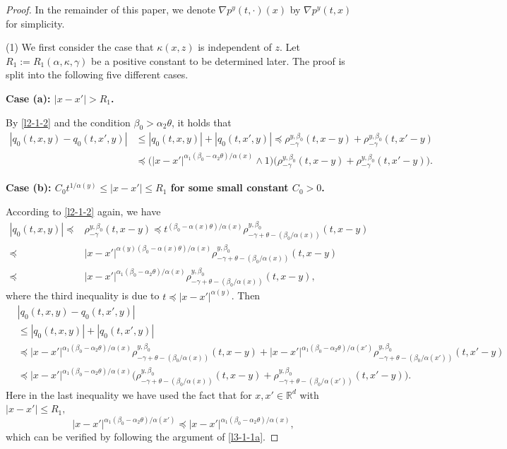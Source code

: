 \documentclass[a4paper,11pt]{amsart}
\renewcommand{\le}{\leqslant}
\newcommand{\R}{\mathds R}
\newcommand{\B}{\beta}
\newcommand{\p}{\preceq}
\newcommand{\K}{\kappa}
\newcommand{\A}{\alpha}
\newcommand{\G}{\gamma}
\theoremstyle{definition}
\begin{document}
\begin{proof} In the remainder of this paper, we denote $\nabla p^y(t,\cdot)(x)$ by $\nabla p^y(t,x)$ for simplicity.

(1) We first consider the case that $\K(x,z)$ is independent of $z$. Let $R_1:=R_1(\A,\K,\G)$ be a positive constant to be determined later. The proof is split into the following five different cases.

{\bf Case (a): $|x-x'|>R_1$.}

By \eqref{l2-1-2} and the condition $\B_0>\A_2\theta$, it holds that
\begin{align*} |q_0(t,x,y)-q_0(t,x',y)|
&\le |q_0(t,x,y)|+|q_0(t,x',y)|\p \rho_{-\gamma}^{y,\B_0}(t,x-y)+\rho_{-\gamma}^{y,\B_0}(t,x'-y)\\
&\p \big(|x-x'|^{{\A_1(\B_0-\A_2\theta)/{\A(x)}}}\wedge1\big)\big(\rho_{-\gamma}^{y,\B_0}(t,x-y)+\rho_{-\gamma}^{y,\B_0}(t,x'-y)\big).\end{align*}



{\bf Case (b): $C_0t^{1/\A(y)}\le |x-x'|\le R_1$ for some small
constant $C_0>0$.}


According to \eqref{l2-1-2} again, we have
\begin{align*} |q_0(t,x,y)|\p& \rho_{-\gamma}^{y,\B_0}(t,x-y)\p t^{{(\B_0-\A(x)\theta)}/{\A(x)}} \rho_{-\gamma+\theta-({\B_0}/{\A(x)})}^{y,\B_0}(t,x-y) \\
\p&|x-x'|^{{{\A(y)(\B_0-\A(x)\theta)}/{\A(x)}}} \rho_{-\gamma+\theta-({\B_0}/{\A(x)})}^{y,\B_0}(t,x-y) \\
\p&|x-x'|^{{\A_1(\B_0-\A_2\theta)/{\A(x)}}} \rho_{-\gamma+\theta-({\B_0}/{\A(x)})}^{y,\B_0}(t,x-y),  \end{align*}
where the third inequality is due to $t\p |x-x'|^{\A(y)}$.
Then
\begin{align*}&|q_0(t,x,y)-q_0(t,x',y)|\\
&\le |q_0(t,x,y)|+|q_0(t,x',y)|\\
&\p |x-\!x'|^{{\A_1(\B_0-\A_2\theta)/{\A(x)}}} \! \rho_{-\gamma+\theta-({\B_0}/{\A(x)})}^{y,\B_0}(t,x-y)  +
|x-\!x'|^{{\A_1(\B_0-\A_2\theta)/{\A(x')}}}\!
\rho_{-\gamma+\theta-({\B_0}/{\A(x')})}^{y,\B_0}(t,x'\!-y)\\
&\p |x-\!x'|^{{\A_1(\B_0-\A_2\theta)/{\A(x)}}}\Big(
\rho_{-\gamma+\theta-({\B_0}/{\A(x)})}^{y,\B_0}(t,x\!-y)+
\rho_{-\gamma+\theta-({\B_0}/{\A(x')})}^{y,\B_0}(t,x'\!-y)\Big).\end{align*}
Here in the last inequality we have used the fact that for $ x,x'\in
\R^d$ with $|x-x'|\le R_1,$
\begin{equation}\label{p3-1-3}
|x-x'|^{{\A_1(\B_0-\A_2\theta)/{\A(x')}}}\p
|x-x'|^{{\A_1(\B_0-\A_2\theta)/{\A(x)}}},
\end{equation}
which can be verified by following the argument of \eqref{l3-1-1a}.


\end{proof}
\end{document}
